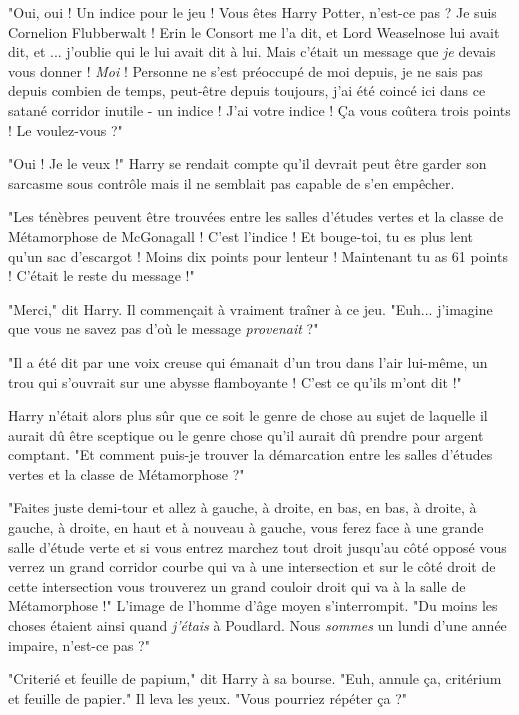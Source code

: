 "Oui, oui ! Un indice pour le jeu ! Vous êtes Harry Potter, n'est-ce pas ? Je suis Cornelion Flubberwalt ! Erin le Consort me l'a dit, et Lord Weaselnose lui avait dit, et ... j'oublie qui le lui avait dit à lui. Mais c'était un message que \emph{je}  devais vous donner ! \emph{Moi}  ! Personne ne s'est préoccupé de moi depuis, je ne sais pas depuis combien de temps, peut-être depuis toujours, j'ai été coincé ici dans ce satané corridor inutile - un indice ! J'ai votre indice ! Ça vous coûtera trois points ! Le voulez-vous ?"

"Oui ! Je le veux !" Harry se rendait compte qu'il devrait peut être garder son sarcasme sous contrôle mais il ne semblait pas capable de s'en empêcher.

"Les ténèbres peuvent être trouvées entre les salles d'études vertes et la classe de Métamorphose de McGonagall ! C'est l'indice ! Et bouge-toi, tu es plus lent qu'un sac d'escargot ! Moins dix points pour lenteur ! Maintenant tu as 61 points ! C'était le reste du message !"

"Merci," dit Harry. Il commençait à vraiment traîner à ce jeu. "Euh... j'imagine que vous ne savez pas d'où le message \emph{provenait}  ?"

"Il a été dit par une voix creuse qui émanait d'un trou dans l'air lui-même, un trou qui s'ouvrait sur une abysse flamboyante ! C'est ce qu'ils m'ont dit !"

Harry n'était alors plus sûr que ce soit le genre de chose au sujet de laquelle il aurait dû être sceptique ou le genre chose qu'il aurait dû prendre pour argent comptant. "Et comment puis-je trouver la démarcation entre les salles d'études vertes et la classe de Métamorphose ?"

"Faites juste demi-tour et allez à gauche, à droite, en bas, en bas, à droite, à gauche, à droite, en haut et à nouveau à gauche, vous ferez face à une grande salle d'étude verte et si vous entrez marchez tout droit jusqu'au côté opposé vous verrez un grand corridor courbe qui va à une intersection et sur le côté droit de cette intersection vous trouverez un grand couloir droit qui va à la salle de Métamorphose !" L'image de l'homme d'âge moyen s'interrompit. "Du moins les choses étaient ainsi quand \emph{j'étais}  à Poudlard. Nous \emph{sommes}  un lundi d'une année impaire, n'est-ce pas ?"

"Criterié et feuille de papium," dit Harry à sa bourse. "Euh, annule ça, critérium et feuille de papier." Il leva les yeux. "Vous pourriez répéter ça ?"

